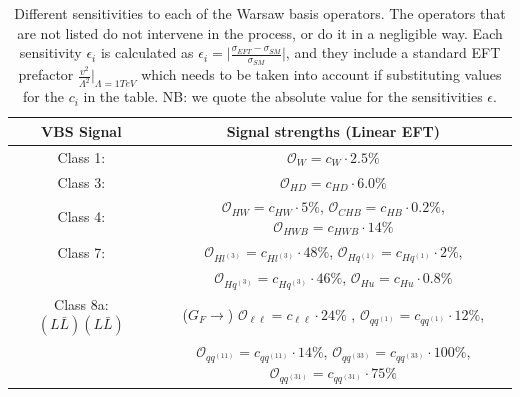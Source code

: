 \documentclass[../report.tex]{subfiles}
\begin{document}

\begin{table}[]
\begin{center}
\small
\begin{tabular}{|c|c|}%
\hline
VBS Signal & Signal strengths (Linear EFT) \\
\hline
 Class 1:  &  $\mathcal{O}_W = c_W \cdot 2.5 \%$ \\
 Class 3: & $\mathcal{O}_{HD} = c_{HD} \cdot 6.0 \%$ \\
 Class 4: & $ \mathcal{O}_{HW} = c_{HW} \cdot 5 \% $, $ \mathcal{O}_{CHB} = c_{HB} \cdot 0.2 \% $,  $ \mathcal{O}_{HWB} = c_{HWB} \cdot 14 \% $\\
 Class 7: & $ \mathcal{O}_{Hl^{(3)}} = c_{Hl^{(3)}} \cdot 48 \% $,
 $ \mathcal{O}_{Hq^{(1)}} = c_{Hq^{(1)}} \cdot 2 \% $, \\ 
 & $ \mathcal{O}_{Hq^{(3)}} = c_{Hq^{(3)}} \cdot 46 \% $,  $ \mathcal{O}_{Hu} = c_{Hu} \cdot 0.8 \% $ 
 \\
 Class 8a: $(L \bar{L})(L \bar{L})$  &  ($G_F \to$) $ \mathcal{O}_{\ell \ell} = c_{\ell \ell} \cdot 24 \% $ , 
 $ \mathcal{O}_{qq^{(1)}} = c_{qq^{(1)}} \cdot 12 \% $, \\ &
$ \mathcal{O}_{qq^{(11)}} = c_{qq^{(11)}} \cdot 14 \% $, 
$ \mathcal{O}_{qq^{(33)}} = c_{qq^{(33)}} \cdot 100 \% $, 
$ \mathcal{O}_{qq^{(31)}} = c_{qq^{(31)}} \cdot 75 \% $
 \\
\hline 
 \end{tabular}
  \caption{  Different sensitivities to each of the Warsaw basis operators. The operators that are not listed do not intervene in the process, or do it in a negligible way. Each sensitivity $\epsilon_i$ is calculated as $\epsilon_i  = \vert \frac{\sigma_{EFT} - \sigma_{SM}}{\sigma_{SM}} \vert$, and they include a standard EFT prefactor $\frac{v^2}{\Lambda^2}\vert_{\Lambda=1TeV}$ which needs to be taken into account if substituting values for the $c_i$ in the table. NB: we quote the absolute value for the sensitivities $\epsilon$.}
  \label{tab:signal}
\end{center}
\end{table}
\end{document}
